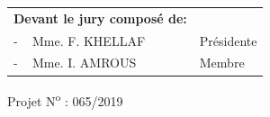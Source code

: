 \documentclass[12pt , a4paper]{report}
\begin{document}
	\vspace*{0.5cm}
	
	\begin{table}[h]
		\begin{tabular}{p{6.5cm}p{5cm}}
			\textbf{Devant le jury composé de:}&\\
			- \,\,\, Mme. F. KHELLAF & Présidente \\
			- \,\,\, Mme. I. AMROUS & Membre \\
		\end{tabular}
	\end{table}
	\vspace*{2.3cm}
	\begin{center}
		Projet N\textsuperscript{o} : 065/2019
	\end{center}
\end{document}
